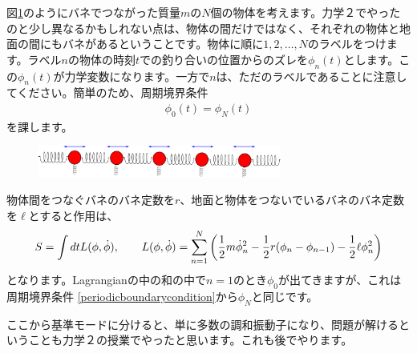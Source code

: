 \documentclass[report,paper=a4, fontsize=12pt, line_length=16cm, number_of_lines=33,dvipdfmx]{jlreq}
\numberwithin{equation}{chapter}
\begin{document}
図\ref{fig:oscillator}のようにバネでつながった質量$m$の$N$個の物体を考えます。力学２でやったのと少し異なるかもしれない点は、物体の間だけではなく、それぞれの物体と地面の間にもバネがあるということです。物体に順に$1,2,\dots,N$のラベルをつけます。ラベル$n$の物体の時刻$t$での釣り合いの位置からのズレを$\phi_n(t)$とします。この$\phi_n(t)$が力学変数になります。一方で$n$は、ただのラベルであることに注意してください。簡単のため、周期境界条件
\begin{align}
  \phi_{0}(t)=\phi_{N}(t)\label{periodicboundarycondition}
\end{align}
を課します。
\begin{figure}[htbp]
  \centering
  \includegraphics[width=8cm]{oscillator.pdf}
  \caption{}
  \label{fig:oscillator}
\end{figure}


物体間をつなぐバネのバネ定数を$r$、地面と物体をつないでいるバネのバネ定数を$\ell$とすると作用は、
\begin{align}
  S=\int dt L(\phi,\dot{\phi}),\qquad
  L(\phi,\dot{\phi})=\sum_{n=1}^{N}\qty(
    \frac12 m \dot{\phi}_n^2-\frac12 r (\phi_n-\phi_{n-1})
    -\frac12 \ell \phi_n^2
  )\label{oscillatorLagrangian}
\end{align}
となります。Lagrangianの中の和の中で$n=1$のとき$\phi_0$が出てきますが、これは周期境界条件
\eqref{periodicboundarycondition}から$\phi_N$と同じです。

ここから基準モードに分けると、単に多数の調和振動子になり、問題が解けるということも力学２の授業でやったと思います。これも後でやります。
\end{document}
